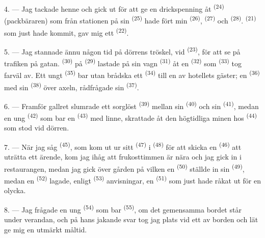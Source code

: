 4. --- Jag tackade henne och gick ut för att ge en drickspenning åt
 \textsuperscript{(24)} (packbäraren) som från stationen på sin
 \textsuperscript{(25)} hade fört min 
\textsuperscript{(26)},  \textsuperscript{(27)} och
 \textsuperscript{(28)}. 
\textsuperscript{(21)} som just hade kommit, gav mig ett  \textsuperscript{(22)}.

5. --- Jag stannade ännu någon tid på dörrens tröskel, vid 
\textsuperscript{(23)}, för att se på trafiken på gatan. 
\textsuperscript{(30)} på  \textsuperscript{(29)} lastade på sin vagn
 \textsuperscript{(31)} åt en  \textsuperscript{(32)} som
 \textsuperscript{(33)} tog farväl av. Ett ungt 
\textsuperscript{(35)} bar utan brådska ett
 \textsuperscript{(34)} till en av hotellets gäster; en
 \textsuperscript{(36)} med sin 
\textsuperscript{(38)} över axeln, rådfrågade sin  \textsuperscript{(37)}.

\VUsaut{4.0mm}
\VUsaut{3.0mm}

6. --- Framför gallret slumrade ett sorglöst  \textsuperscript{(39)} mellan
sin  \textsuperscript{(40)} och sin
 \textsuperscript{(41)}, medan en ung 
\textsuperscript{(42)} som bar en  \textsuperscript{(43)} med linne, skrattade åt
den högtidliga minen hos  \textsuperscript{(44)} som stod vid dörren.

7. --- När jag såg  \textsuperscript{(45)}, som kom ut ur sitt
 \textsuperscript{(47)} i 
\textsuperscript{(48)} för att skicka en  \textsuperscript{(46)} att uträtta
ett ärende, kom jag ihåg att frukosttimmen är nära och jag gick in i restaurangen, medan jag
gick över gården på vilken en
 \textsuperscript{(50)} ställde in sin 
\textsuperscript{(49)}, medan en  \textsuperscript{(52)} lagade, enligt
 \textsuperscript{(53)} anvisningar, en
 \textsuperscript{(51)} som just hade råkat ut för en
olycka.

8. --- Jag frågade en ung  \textsuperscript{(54)} som bar
 \textsuperscript{(55)}, om det gemensamma bordet står under
verandan, och på hans jakande svar tog jag plats vid ett av borden och lät ge mig en utmärkt
måltid.

